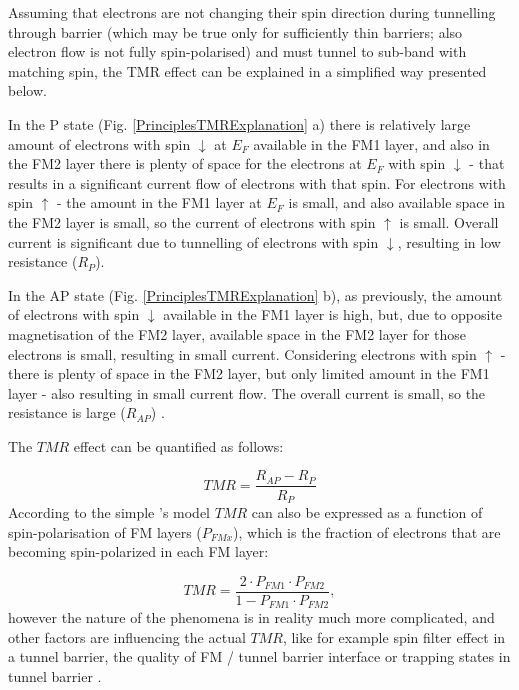     Assuming that electrons are not changing their spin direction during tunnelling through barrier (which may be true only for sufficiently thin barriers; also electron flow is not fully spin-polarised) and must tunnel to sub-band with matching spin, the TMR effect can be explained in a simplified way presented below. 
    
    In the P state (Fig. \ref{PrinciplesTMRExplanation} a) there is relatively large amount of electrons with spin $\downarrow$ at $E_F$ available in the FM1 layer, and also in the FM2 layer there is plenty of space for the electrons at $E_F$ with spin $\downarrow$ - that results in a significant current flow of electrons with that spin. For electrons with spin $\uparrow$ - the amount in the FM1 layer at $E_F$ is small, and also available space in the FM2 layer is small, so the current of electrons with spin $\uparrow$ is small. Overall current is significant due to tunnelling of electrons with spin $\downarrow$, resulting in low resistance ($R_{P}$).
    
    In the AP state (Fig. \ref{PrinciplesTMRExplanation} b), as previously, the amount of electrons with spin $\downarrow$ available in the FM1 layer is high, but, due to opposite magnetisation of the FM2 layer, available space in the FM2 layer for those electrons is small, resulting in small current. Considering electrons with spin $\uparrow$ - there is plenty of space in the FM2 layer, but only limited amount in the FM1 layer - also resulting in small current flow. The overall current is small, so the resistance is large ($R_{AP}$) \cite{yuasa2007giant}. 
    
    The $TMR$ effect can be quantified as follows:
    
    \begin{equation} \label{eq:TMRdef}
		TMR = \frac{R_{AP}-R_{P}}{R_{P}}
	\end{equation}
According to the simple \citeauthor{julliere1975tunneling}'s model \cite{julliere1975tunneling} $TMR$ can also be expressed as a function of spin-polarisation of FM layers ($P_{FMx}$), which is the fraction of electrons that are becoming spin-polarized in each FM layer:
    
    \begin{equation} \label{eq:TMRpolarization}
		TMR = \frac{2\cdot P_{FM1}\cdot P_{FM2}}{1-P_{FM1}\cdot P_{FM2}},
	\end{equation}
however the nature of the phenomena is in reality much more complicated, and other factors are influencing the actual $TMR$, like for example spin filter effect in a tunnel barrier, the quality of FM / tunnel barrier interface or trapping states in tunnel barrier \cite{teixeira2011resonant}.

